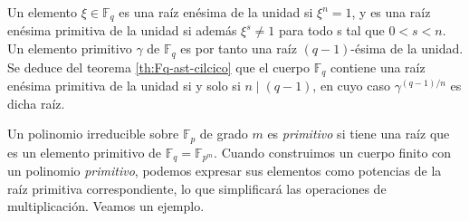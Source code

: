 Un elemento \(\xi \in \mathbb F_q\) es una raíz enésima de la unidad si \(\xi^n = 1\), y es una raíz enésima primitiva de la unidad si además \(\xi^s \neq 1\) para todo s tal que \(0 < s < n\).
Un elemento primitivo \(\gamma\) de \(\mathbb F_q\) es por tanto una raíz \((q-1)\)-ésima de la unidad.
Se deduce del teorema \ref{th:Fq-ast-cilcico} que el cuerpo \(\mathbb F_q\) contiene una raíz enésima primitiva de la unidad si y solo si \(n \mid (q - 1)\), en cuyo caso \(\gamma^{(q-1)/n}\) es dicha raíz.





Un polinomio irreducible sobre \(\mathbb F_p\) de grado \(m\) es \textit{primitivo} si tiene una raíz que es un elemento primitivo de \(\mathbb F_q = \mathbb F_{p^m}\).
Cuando construimos un cuerpo finito con un polinomio \emph{primitivo}, podemos expresar sus elementos como potencias de la raíz primitiva correspondiente, lo que simplificará las operaciones de multiplicación.
Veamos un ejemplo.

